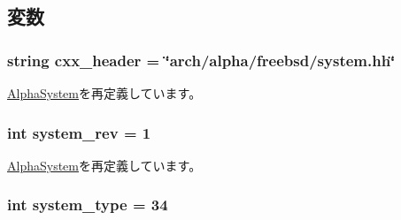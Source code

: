 \subsection{変数}
\hypertarget{classAlphaSystem_1_1FreebsdAlphaSystem_a17da7064bc5c518791f0c891eff05fda}{
\subsubsection[{cxx\_\-header}]{\setlength{\rightskip}{0pt plus 5cm}string cxx\_\-header = \char`\"{}arch/alpha/freebsd/system.hh\char`\"{}}}
\label{classAlphaSystem_1_1FreebsdAlphaSystem_a17da7064bc5c518791f0c891eff05fda}


\hyperlink{classAlphaSystem_1_1AlphaSystem_a17da7064bc5c518791f0c891eff05fda}{AlphaSystem}を再定義しています。\hypertarget{classAlphaSystem_1_1FreebsdAlphaSystem_a261e4081ddd1f0823eccc0f042086c27}{
\subsubsection[{system\_\-rev}]{\setlength{\rightskip}{0pt plus 5cm}int system\_\-rev = 1}}
\label{classAlphaSystem_1_1FreebsdAlphaSystem_a261e4081ddd1f0823eccc0f042086c27}


\hyperlink{classAlphaSystem_1_1AlphaSystem_a0f86e3835b8bf2135faf7b1bab968494}{AlphaSystem}を再定義しています。\hypertarget{classAlphaSystem_1_1FreebsdAlphaSystem_acfe3506cfe10e05a2cb2c2973dc5dad2}{
\subsubsection[{system\_\-type}]{\setlength{\rightskip}{0pt plus 5cm}int system\_\-type = 34}}
\label{classAlphaSystem_1_1FreebsdAlphaSystem_acfe3506cfe10e05a2cb2c2973dc5dad2}


